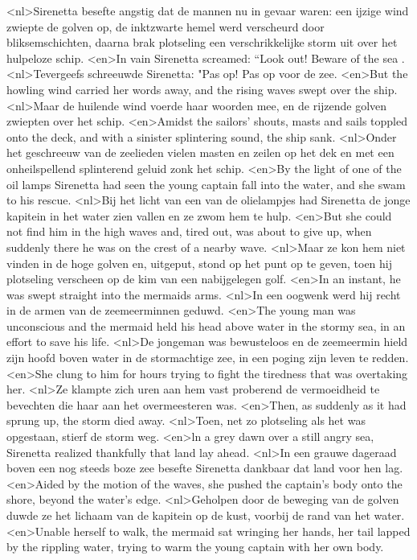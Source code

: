 <nl>Sirenetta besefte angstig dat de mannen nu in gevaar waren: een ijzige wind zwiepte de golven op, de inktzwarte hemel werd verscheurd door bliksemschichten, daarna brak plotseling een verschrikkelijke storm uit over het hulpeloze schip.
<en>In vain Sirenetta screamed: “Look out! Beware of the sea .
<nl>Tevergeefs schreeuwde Sirenetta: "Pas op! Pas op voor de zee.
<en>But the howling wind carried her words away, and the rising waves swept over the ship.
<nl>Maar de huilende wind voerde haar woorden mee, en de rijzende golven zwiepten over het schip.
<en>Amidst the sailors’ shouts, masts and sails toppled onto the deck, and with a sinister splintering sound, the ship sank.
<nl>Onder het geschreeuw van de zeelieden vielen masten en zeilen op het dek en met een onheilspellend splinterend geluid zonk het schip.
<en>By the light of one of the oil lamps Sirenetta had seen the young captain fall into the water, and she swam to his rescue.
<nl>Bij het licht van een van de olielampjes had Sirenetta de jonge kapitein in het water zien vallen en ze zwom hem te hulp.
<en>But she could not find him in the high waves and, tired out, was about to give up, when suddenly there he was on the crest of a nearby wave.
<nl>Maar ze kon hem niet vinden in de hoge golven en, uitgeput, stond op het punt op te geven, toen hij plotseling verscheen op de kim van een nabijgelegen golf.
<en>In an instant, he was swept straight into the mermaids arms.
<nl>In een oogwenk werd hij recht in de armen van de zeemeerminnen geduwd.
<en>The young man was unconscious and the mermaid held his head above water in the stormy sea, in an effort to save his life.
<nl>De jongeman was bewusteloos en de zeemeermin hield zijn hoofd boven water in de stormachtige zee, in een poging zijn leven te redden.
<en>She clung to him for hours trying to fight the tiredness that was overtaking her.
<nl>Ze klampte zich uren aan hem vast  proberend de vermoeidheid te bevechten  die haar aan het overmeesteren was.
<en>Then, as suddenly as it had sprung up, the storm died away.
<nl>Toen, net zo plotseling als het was opgestaan, stierf de storm weg.
<en>ln a grey dawn over a still angry sea, Sirenetta realized thankfully that land lay ahead.
<nl>In een grauwe dageraad boven een nog steeds boze zee besefte Sirenetta dankbaar dat land voor hen lag.
<en>Aided by the motion of the waves, she pushed the captain’s body onto the shore, beyond the water’s edge.
<nl>Geholpen door de beweging van de golven duwde ze het lichaam van de kapitein op  de kust, voorbij de rand van het water.
<en>Unable herself to walk, the mermaid sat wringing her hands, her tail lapped by the rippling water, trying to warm the young captain with her own body.
